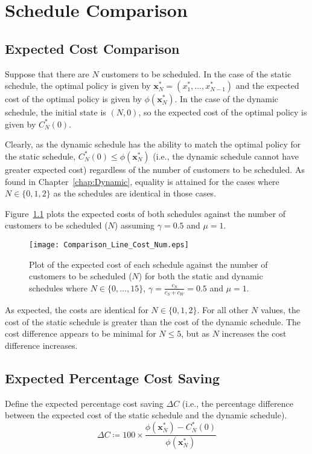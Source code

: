 \chapter{Schedule Comparison}
\label{chap:Comparison}
\section{Expected Cost Comparison}
Suppose that there are $N$ customers to be scheduled. In the case of the static schedule, the optimal policy is given by $\mathbf{x}_{N}^{*} = (x_{1}^{*}, \ldots, x_{N - 1}^{*})$ and the expected cost of the optimal policy is given by $\phi (\mathbf{x}_{N}^{*})$. In the case of the dynamic schedule, the initial state is $(N, 0)$, so the expected cost of the optimal policy is given by $C_{N}^{*} (0)$.

Clearly, as the dynamic schedule has the ability to match the optimal policy for the static schedule, $C_{N}^{*} (0) \leq \phi (\mathbf{x}_{N}^{*})$ (i.e., the dynamic schedule cannot have greater expected cost) regardless of the number of customers to be scheduled. As found in Chapter~\ref{chap:Dynamic}, equality is attained for the cases where $N \in \{ 0, 1, 2 \}$ as the schedules are identical in those cases.

Figure~\ref{Graph_Cost_Comparison} plots the expected costs of both schedules against the number of customers to be scheduled ($N$) assuming $\gamma = 0.5$ and $\mu = 1$.
\begin{figure}[htb]
	\centering
	\texttt{[image: Comparison\_Line\_Cost\_Num.eps]}
	\caption{Plot of the expected cost of each schedule against the number of customers to be scheduled ($N$) for both the static and dynamic schedules where $N \in \{ 0, \ldots, 15 \}$, $\gamma = \frac{c_{S}}{c_{S} + c_{W}} = 0.5$ and $\mu = 1$.}
	\label{Graph_Cost_Comparison}
\end{figure}

As expected, the costs are identical for $N \in \{ 0, 1, 2 \}$. For all other $N$ values, the cost of the static schedule is greater than the cost of the dynamic schedule. The cost difference appears to be minimal for $N \leq 5$, but as $N$ increases the cost difference increases.

\section{Expected Percentage Cost Saving}
Define the expected percentage cost saving $\Delta C$ (i.e., the percentage difference between the expected cost of the static schedule and the dynamic schedule).
\begin{equation}
	\Delta C \coloneqq 100 \times \frac{\phi (\mathbf{x}_{N}^{*}) - C_{N}^{*} (0)}{\phi (\mathbf{x}_{N}^{*})}
\end{equation}

